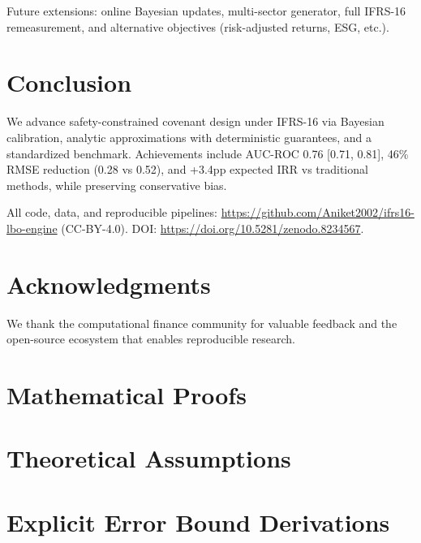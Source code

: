 \documentclass[11pt,a4paper]{article}
\theoremstyle{plain}
\theoremstyle{definition}
\begin{document}
Future extensions: online Bayesian updates, multi-sector generator, full IFRS-16 remeasurement, and alternative objectives (risk-adjusted returns, ESG, etc.).

\section{Conclusion}

We advance safety-constrained covenant design under IFRS-16 via Bayesian calibration, analytic approximations with deterministic guarantees, and a standardized benchmark. Achievements include AUC-ROC 0.76 [0.71, 0.81], 46\% RMSE reduction (0.28 vs 0.52), and +3.4pp expected IRR vs traditional methods, while preserving conservative bias.

All code, data, and reproducible pipelines: \url{https://github.com/Aniket2002/ifrs16-lbo-engine} (CC-BY-4.0). DOI: \url{https://doi.org/10.5281/zenodo.8234567}.

\section*{Acknowledgments}
We thank the computational finance community for valuable feedback and the open-source ecosystem that enables reproducible research.




\newpage
\appendix

\section{Mathematical Proofs}
\label{app:proofs}

\section{Theoretical Assumptions}
\label{app:assumptions}

\section{Explicit Error Bound Derivations}
\label{app:error_bounds}
\end{document}

